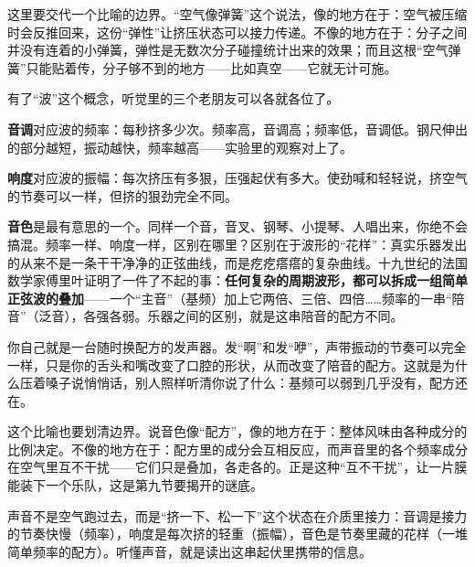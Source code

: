 \begin{mainline}
这里要交代一个比喻的边界。“空气像弹簧”这个说法，像的地方在于：空气被压缩时会反推回来，这份“弹性”让挤压状态可以接力传递。不像的地方在于：分子之间并没有连着的小弹簧，弹性是无数次分子碰撞统计出来的效果；而且这根“空气弹簧”只能贴着传，分子够不到的地方——比如真空——它就无计可施。

有了“波”这个概念，听觉里的三个老朋友可以各就各位了。

\textbf{音调}对应波的频率：每秒挤多少次。频率高，音调高；频率低，音调低。钢尺伸出的部分越短，振动越快，频率越高——实验里的观察对上了。

\textbf{响度}对应波的振幅：每次挤压有多狠，压强起伏有多大。使劲喊和轻轻说，挤空气的节奏可以一样，但挤的狠劲完全不同。

\textbf{音色}是最有意思的一个。同样一个音，音叉、钢琴、小提琴、人唱出来，你绝不会搞混。频率一样、响度一样，区别在哪里？区别在于波形的“花样”：真实乐器发出的从来不是一条干干净净的正弦曲线，而是疙疙瘩瘩的复杂曲线。十九世纪的法国数学家傅里叶证明了一件了不起的事：\textbf{任何复杂的周期波形，都可以拆成一组简单正弦波的叠加}——一个“主音”（基频）加上它两倍、三倍、四倍……频率的一串“陪音”（泛音），各强各弱。乐器之间的区别，就是这串陪音的配方不同。

你自己就是一台随时换配方的发声器。发“啊”和发“咿”，声带振动的节奏可以完全一样，只是你的舌头和嘴改变了口腔的形状，从而改变了陪音的配方。这就是为什么压着嗓子说悄悄话，别人照样听清你说了什么：基频可以弱到几乎没有，配方还在。

这个比喻也要划清边界。说音色像“配方”，像的地方在于：整体风味由各种成分的比例决定。不像的地方在于：配方里的成分会互相反应，而声音里的各个频率成分在空气里互不干扰——它们只是叠加，各走各的。正是这种“互不干扰”，让一片膜能装下一个乐队，这是第九节要揭开的谜底。
\end{mainline}


\begin{oneline}
声音不是空气跑过去，而是“挤一下、松一下”这个状态在介质里接力：音调是接力的节奏快慢（频率），响度是每次挤的轻重（振幅），音色是节奏里藏的花样（一堆简单频率的配方）。听懂声音，就是读出这串起伏里携带的信息。
\end{oneline}


